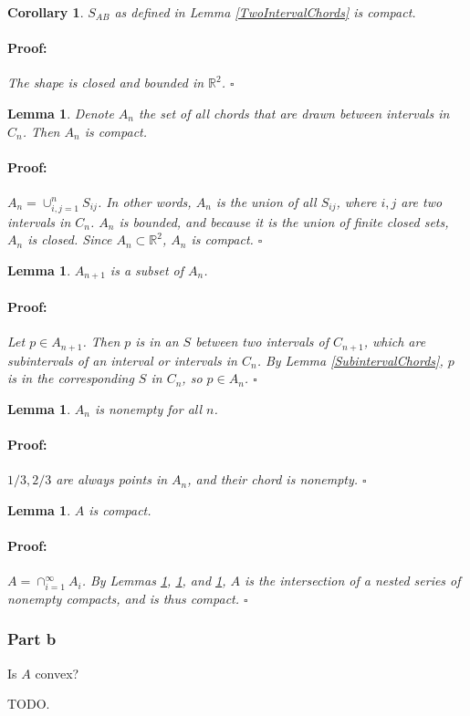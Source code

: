 \documentclass{article}
\newenvironment{proof}{\paragraph{Proof:}}{\hfill$\square$}
\newtheorem{lemma}[theorem]{Lemma}
\newtheorem{corollary}[theorem]{Corollary}
\begin{document}
\begin{corollary}
\label{TwoIntervalCompact}
$S_{AB}$ as defined in Lemma \ref{TwoIntervalChords} is compact.
\begin{proof}
The shape is closed and bounded in $\mathbb{R}^2$.
\end{proof}
\end{corollary}

\begin{lemma}
\label{ChordAIsCompact}
Denote $A_n$ the set of all chords that are drawn between intervals in $C_n$. Then $A_n$ is compact.
\begin{proof}
$A_n = \cup_{i, j=1}^n S_{ij}$. In other words, $A_n$ is the union of all $S_{ij}$, where $i, j$ are two intervals in $C_n$. $A_n$ is bounded, and because it is the union of finite closed sets, $A_n$ is closed. Since $A_n \subset \mathbb{R}^2$, $A_n$ is compact.
\end{proof}
\end{lemma}

\begin{lemma}
\label{ChordAIsNested}
$A_{n+1}$ is a subset of $A_n$.
\begin{proof}
Let $p \in A_{n+1}$. Then $p$ is in an $S$ between two intervals of $C_{n+1}$, which are subintervals of an interval or intervals in $C_n$. By Lemma \ref{SubintervalChords}, $p$ is in the corresponding $S$ in $C_n$, so $p \in A_n$.
\end{proof}
\end{lemma}

\begin{lemma}
\label{ChordAIsNonempty}
$A_n$ is nonempty for all $n$.
\begin{proof}
${1/3, 2/3}$ are always points in $A_n$, and their chord is nonempty.
\end{proof}
\end{lemma}

\begin{lemma}
$A$ is compact.
\begin{proof}
$A = \cap_{i=1}^\infty A_i$. By Lemmas \ref{ChordAIsCompact}, \ref{ChordAIsNested}, and \ref{ChordAIsNonempty}, $A$ is the intersection of a nested series of nonempty compacts, and is thus compact. 
\end{proof}
\end{lemma}

\subsubsection*{Part b}
Is $A$ convex?

TODO.
\end{document}
